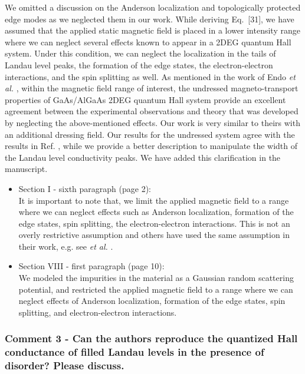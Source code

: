 \documentclass{article}
\begin{document}
We omitted a discussion on the Anderson localization and topologically protected edge modes as we neglected them in our work.
While deriving Eq.~[31], we have assumed that the applied static magnetic field is placed in a lower intensity range where we can neglect several effects known to appear in a 2DEG quantum Hall system. Under this condition, we can neglect the localization in the tails of Landau level peaks, the formation of the edge states, the electron-electron interactions, and the spin splitting as well. As mentioned in the work of Endo \textit{et al.} \cite{endo09}, within the magnetic field range of interest, the undressed
magneto-transport properties of GaAs/AlGaAs 2DEG quantum Hall system provide an excellent agreement between the experimental observations and theory that was developed by neglecting the above-mentioned effects. Our work is very similar to theirs with an additional dressing field. Our results for the undressed system agree with the results in Ref. \cite{endo09}, while we provide a better description to manipulate the width of the Landau level conductivity peaks. We have added this clarification in the manuscript.

\begin{itemize}
  \item Section I - sixth paragraph (page 2):\\
  {\color{Red}
  It is important to note that, we limit the applied magnetic field to a range where we can neglect effects such as Anderson localization, formation of the edge states, spin splitting, the electron-electron interactions. This is not an overly restrictive assumption and others have used the same assumption in their work, e.g. see \textit{et al.} \cite{endo09}.
  }
  \item Section VIII - first paragraph (page 10):\\
  {\color{Red}
  We modeled the impurities in the material as a Gaussian random scattering potential, and restricted the applied magnetic field to a range where we can neglect effects of Anderson localization, formation of the edge states, spin splitting, and electron-electron interactions.
  }
\end{itemize}


\subsubsection*{Comment 3 -
\color{RoyalBlue} Can the authors reproduce the quantized Hall conductance of filled Landau levels in the presence of disorder? Please discuss.
}
\end{document}
